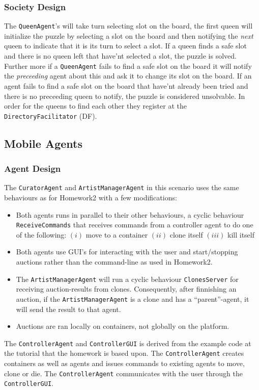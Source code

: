 \documentclass[a4paper, 11pt]{article}
\begin{document}
\subsubsection*{Society Design}
The \texttt{QueenAgent}'s will take turn selecting slot on the board, the first queen will initialize the puzzle by selecting a slot on the board and then notifying the \textit{next} queen to indicate that it is its turn to select a slot. If a queen finds a safe slot and there is no queen left that have'nt selected a slot, the puzzle is solved. Further more if a \texttt{QueenAgent} fails to find a safe slot on the board it will notify the \textit{preceeding} agent about this and ask it to change its slot on the board. If an agent fails to find a safe slot on the board that have'nt already been tried and there is no preceeding queen to notify, the puzzle is considered unsolvable. In order for the queens to find each other they register at the \texttt{DirectoryFacilitator} (DF).
\subsection*{Mobile Agents}
\subsubsection*{Agent Design}
The \texttt{CuratorAgent} and \texttt{ArtistManagerAgent} in this scenario uses the same behaviours as for Homework2 with a few modifications:
\begin{itemize}
\item Both agents runs in parallel to their other behaviours, a cyclic behaviour \texttt{ReceiveCommands} that receives commands from a controller agent to do one of the following: $(i)$ move to a container $(ii)$ clone itself $(iii)$ kill itself
\item Both agents use GUI's for interacting with the user and start/stopping auctions rather than the command-line as used in Homework2.
\item The \texttt{ArtistManagerAgent} will run a cyclic behaviour \texttt{ClonesServer} for receiving auction-results from clones. Consequently, after finnishing an auction, if the \texttt{ArtistManagerAgent} is a clone and has a ``parent''-agent, it will send the result to that agent.
\item Auctions are ran locally on containers, not globally on the platform.
\end{itemize}
The \texttt{ControllerAgent} and \texttt{ControllerGUI} is derived from the example code at the tutorial \citep{jade_tutorial2} that the homework is based upon. The \texttt{ControllerAgent} creates containers as well as agents and issues commands to existing agents to move, clone or die. The \texttt{ControllerAgent} communicates with the user through the \texttt{ControllerGUI}.
\end{document}
